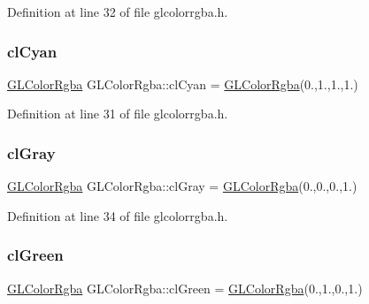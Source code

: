 Definition at line 32 of file glcolorrgba.\+h.

\mbox{\label{class_g_l_color_rgba_a9c1574f1f48d60c98ffda644550ed3f6}} 
\subsubsection{\texorpdfstring{clCyan}{clCyan}}
{\footnotesize\ttfamily \mbox{\hyperlink{class_g_l_color_rgba}{G\+L\+Color\+Rgba}} G\+L\+Color\+Rgba\+::cl\+Cyan = \mbox{\hyperlink{class_g_l_color_rgba}{G\+L\+Color\+Rgba}}(0.,1.,1.,1.)\hspace{0.3cm}{\ttfamily [static]}}



Definition at line 31 of file glcolorrgba.\+h.

\mbox{\label{class_g_l_color_rgba_ac017bac6b8a0c5318a32277a9f8fa2b9}} 
\subsubsection{\texorpdfstring{clGray}{clGray}}
{\footnotesize\ttfamily \mbox{\hyperlink{class_g_l_color_rgba}{G\+L\+Color\+Rgba}} G\+L\+Color\+Rgba\+::cl\+Gray = \mbox{\hyperlink{class_g_l_color_rgba}{G\+L\+Color\+Rgba}}(0.,0.,0.,1.)\hspace{0.3cm}{\ttfamily [static]}}



Definition at line 34 of file glcolorrgba.\+h.

\mbox{\label{class_g_l_color_rgba_afbceb0d8b2cbbc56d4ac491a7a87ea63}} 
\subsubsection{\texorpdfstring{clGreen}{clGreen}}
{\footnotesize\ttfamily \mbox{\hyperlink{class_g_l_color_rgba}{G\+L\+Color\+Rgba}} G\+L\+Color\+Rgba\+::cl\+Green = \mbox{\hyperlink{class_g_l_color_rgba}{G\+L\+Color\+Rgba}}(0.,1.,0.,1.)\hspace{0.3cm}{\ttfamily [static]}}



